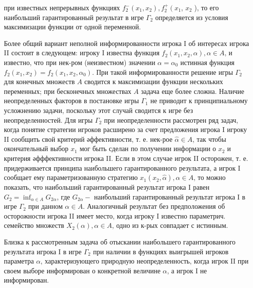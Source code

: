 \documentclass[10pt]{article}
\begin{document}
при известных непрерывных функциях $f_{2}^{-}\left(x_{1}, x_{2}\right), f_{2}^{+}\left(x_{1}\right.$, $x_{2}$ ), то его наибольший гарантированный результат в игре $\Gamma_{2}$ определяется из условия максимизации функции от одной переменной.



Более общий вариант неполной информированности игрока I об интересах игрока II состоит в следующем: игроку I известна функция $f_{2}\left(x_{1}, x_{2}, \alpha\right), \alpha \in A$, и известно, что при нек-ром (неизвестном) значении $\alpha=\alpha_{0}$ истинная функция $f_{2}\left(x_{1}, x_{2}\right)=f_{2}\left(x_{1}, x_{2}, \alpha_{0}\right)$. При такой информированности решение игры $\Gamma_{2}$ для конечных множеств $A$ сводится к максимизации функции нескольких переменных; при бесконечных множествах $A$ задача еще более сложна. Наличие неопределенных факторов в постановке игры $\Gamma_{1}$ не приводит к принципиальному усложнению задачи, поскольку этот случай сводится к игре без неопределенностей. Для игры $\Gamma_{2}$ при неопределенности рассмотрен ряд задач, когда понятие стратегии игроков расширено за счет предложения игрока I игроку II сообщить свой критерий әффективности, т. е. нек-рое $\hat{\alpha} \in A$, так чтобы окончательный выбор $x_{1}$ мог быть сделан по получении информации о $x_{2}$ и критерия әфффективности игрока II. Если в этом случае игрок II осторожен, т. е. придерживается принципа наибольшего гарантированного результата, а игрок I сообщает ему параметризованную стратегию $x_{1}\left(x_{2}, \hat{\alpha}\right), \alpha \in A$, то можно показать, что наибольший гарантированный результат игрока I равен $G_{2}=\inf _{\alpha \in A} G_{2 \alpha}$, где $G_{2 \alpha}-$ наибольший гарантированный результат игрока I в игре $\Gamma_{2}$ при данном $\alpha \in A$. Аналогичный результат без предположения об осторожности игрока II имеет место, когда игроку I известно параметрич. семейство множеств $X_{2}(\alpha), \alpha \in A$, одно из к-рых совпадает с истинным.



Близка к рассмотренным задача об отыскании наибольшего гарантированного результата игрока I в игре $\Gamma_{2}$ при наличии в функциях выигрышей игроков параметра $\alpha$, характеризующего природную неопределенность, когда игрок II при своем выборе информирован о конкретной величине $\alpha$, а игрок I не информирован.
\end{document}

